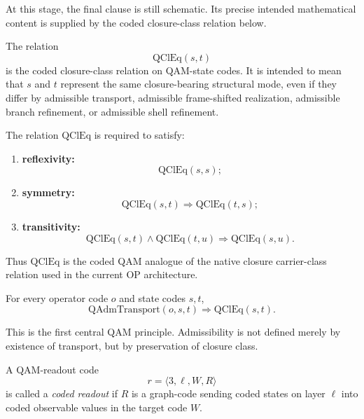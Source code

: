 \begin{remark}
At this stage, the final clause is still schematic. Its precise intended mathematical content is supplied by the coded closure-class relation below.
\end{remark}

\begin{definition}
The relation
\[
\mathrm{QClEq}(s,t)
\]
is the coded closure-class relation on QAM-state codes. It is intended to mean that $s$ and $t$ represent the same closure-bearing structural mode, even if they differ by admissible transport, admissible frame-shifted realization, admissible branch refinement, or admissible shell refinement.
\end{definition}

\begin{axiom}
The relation $\mathrm{QClEq}$ is required to satisfy:
\begin{enumerate}
\item \textbf{reflexivity:}
\[
\mathrm{QClEq}(s,s);
\]
\item \textbf{symmetry:}
\[
\mathrm{QClEq}(s,t)\Longrightarrow \mathrm{QClEq}(t,s);
\]
\item \textbf{transitivity:}
\[
\mathrm{QClEq}(s,t)\wedge \mathrm{QClEq}(t,u)\Longrightarrow \mathrm{QClEq}(s,u).
\]
\end{enumerate}
\end{axiom}

\begin{remark}
Thus $\mathrm{QClEq}$ is the coded QAM analogue of the native closure carrier-class relation used in the current OP architecture.
\end{remark}

\begin{axiom}
For every operator code $o$ and state codes $s,t$,
\[
\mathrm{QAdmTransport}(o,s,t)\Longrightarrow \mathrm{QClEq}(s,t).
\]
\end{axiom}

\begin{remark}
This is the first central QAM principle. Admissibility is not defined merely by existence of transport, but by preservation of closure class.
\end{remark}

\begin{definition}
A QAM-readout code
\[
r=\langle 3,\ell,W,R\rangle
\]
is called a \emph{coded readout} if $R$ is a graph-code sending coded states on layer $\ell$ into coded observable values in the target code $W$.
\end{definition}

